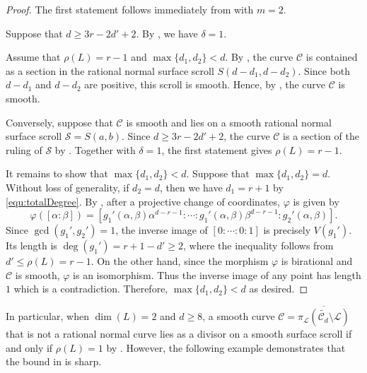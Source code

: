 \documentclass[a4paper, 11pt]{amsart}
\numberwithin{theorem}{section}
\theoremstyle{definition}
\numberwithin{equation}{section}
\begin{document}
\begin{proof}
The first statement follows immediately from  with $m=2$.

Suppose that $d\geq 3r-2d'+2$.
By , we have $\delta=1$.

Assume that $\rho(L)=r-1$ and $\max\{d_1,d_2\}<d$.
By , the curve $\mathcal{C}$ is contained as a section in the rational normal surface scroll $S(d-d_1,d-d_2)$.
Since both $d-d_1$ and $d-d_2$ are positive, this scroll is smooth.
Hence, by , the curve $\mathcal{C}$ is smooth.

Conversely, suppose that $\mathcal{C}$ is smooth and lies on a smooth rational normal surface scroll $\mathcal S=S(a,b)$.
Since $d\geq 3r-2d'+2$, the curve $\mathcal{C}$ is a section of the ruling of $\mathcal S$ by .
Together with $\delta=1$, the first statement gives $\rho(L)=r-1$.

It remains to show that $\max\{d_1,d_2\}<d$.
Suppose that $\max\{d_1,d_2\} = d$.
Without loss of generality, if $d_2=d$, then we have $d_1=r+1$ by \eqref{equ:totalDegree}.
By , after a projective change of coordinates, $\varphi$ is given by
\[
\varphi([\alpha:\beta])=[g_1'(\alpha,\beta)\alpha^{d-r-1}:\cdots:g_1'(\alpha,\beta)\beta^{d-r-1}:g_2'(\alpha,\beta)].
\]
Since $\gcd(g_1',g_2')=1$, the inverse image of $[0:\cdots:0:1]$ is precisely $V(g_1')$.
Its length is $\deg(g_1')=r+1-d'\geq 2$, where the inequality follows from $d'\leq\rho(L)=r-1$.
On the other hand, since the morphism $\varphi$ is birational and $\mathcal{C}$ is smooth, $\varphi$ is an isomorphism.
Thus the inverse image of any point has length $1$ which is a contradiction.
Therefore, $\max\{d_1,d_2\}<d$ as desired.
\end{proof}
In particular, when $\dim(L) = 2$ and $d \geq 8$, a smooth curve $\mathcal{C} = \overline{\pi_{\mathcal{L}}(\widetilde{\mathcal{C}_d}\setminus \mathcal{L})}$ that is not a rational normal curve lies as a divisor on a smooth surface scroll if and only if $\rho(L) = 1$ by . 
However, the following example demonstrates that the bound in  is sharp.
\end{document}
